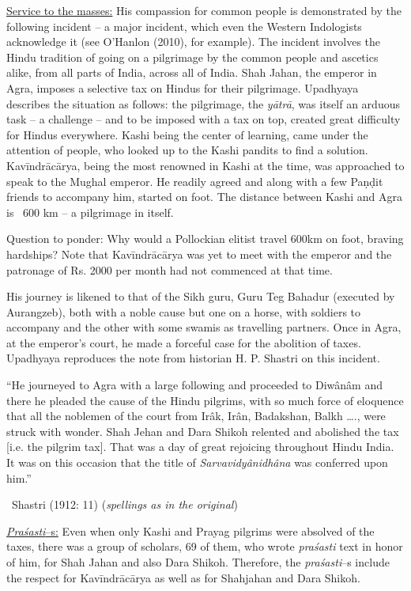 \underline{Service to the masses:} His compassion for common people is demonstrated by the following incident – a major incident, which even the Western Indologists acknowledge it (see O’Hanlon (2010), for example). The incident involves the Hindu tradition of going on a pilgrimage by the common people and ascetics alike, from all parts of India, across all of India. Shah Jahan, the emperor in Agra, imposes a selective tax on Hindus for their pilgrimage. Upadhyaya describes the situation as follows: the pilgrimage, the \textit{yātrā}, was itself an arduous task – a challenge – and to be imposed with a tax on top, created great difficulty for Hindus everywhere. Kashi being the center of learning, came under the attention of people, who looked up to the Kashi pandits to find a solution. Kavīndrācārya, being the most renowned in Kashi at the time, was approached to speak to the Mughal emperor. He readily agreed and along with a few Paṇḍit friends to accompany him, started on foot. The distance between Kashi and Agra is ~600 km – a pilgrimage in itself.

Question to ponder: Why would a Pollockian elitist travel 600km on foot, braving hardships? Note that Kavīndrācārya was yet to meet with the emperor and the patronage of Rs. 2000 per month had not commenced at that time.

His journey is likened to that of the Sikh guru, Guru Teg Bahadur (executed by Aurangzeb), both with a noble cause but one on a horse, with soldiers to accompany and the other with some swamis as travelling partners. Once in Agra, at the emperor’s court, he made a forceful case for the abolition of taxes. Upadhyaya reproduces the note from historian H. P. Shastri on this incident.

\begin{myquote}
“He journeyed to Agra with a large following and proceeded to Diwânâm and there he pleaded the cause of the Hindu pilgrims, with so much force of eloquence that all the noblemen of the court from Irâk, Irân, Badakshan, Balkh …., were struck with wonder. Shah Jehan and Dara Shikoh relented and abolished the tax [i.e. the pilgrim tax]. That was a day of great rejoicing throughout Hindu India. It was on this occasion that the title of \textit{Sarvavidyânidhâna} was conferred upon him.” 

~\hfill Shastri (1912: 11) (\textit{spellings as in the original})
\end{myquote}

\underline{\textit{Praśasti}–s:} Even when only Kashi and Prayag pilgrims were absolved of the taxes, there was a group of scholars, 69 of them, who wrote \textit{praśasti} text in honor of him, for Shah Jahan and also Dara Shikoh. Therefore, the \textit{praśasti}–s include the respect for Kavīndrācārya as well as for Shahjahan and Dara Shikoh.

